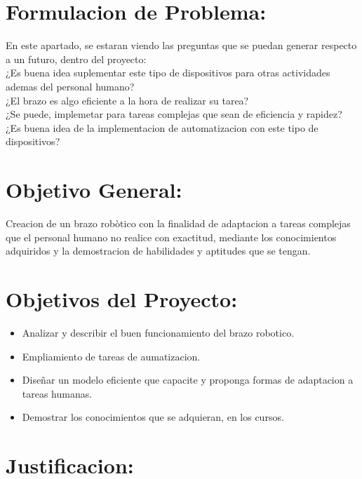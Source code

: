 \documentclass[14pt,a4paper]{article}
\begin{document}
\section{Formulacion de Problema:}

En este apartado, se estaran viendo las preguntas que se puedan generar respecto a un futuro, dentro del proyecto:\\

¿Es buena idea suplementar este tipo de dispositivos para otras actividades ademas del personal humano?\\
¿El brazo es algo eficiente a la hora de realizar su tarea?\\
¿Se puede, implemetar para tareas complejas que sean de eficiencia y rapidez?\\
¿Es buena idea de la implementacion de automatizacion con este tipo de dispositivos? 

\section{Objetivo General:}

Creacion de un brazo robòtico con la finalidad de adaptacion a tareas complejas que el personal humano no realice con exactitud, mediante los conocimientos adquiridos y la demostracion de habilidades y aptitudes que se tengan. 

\section{Objetivos del Proyecto:}

\begin{itemize}
\item Analizar y describir el buen funcionamiento del brazo robotico.
\item Empliamiento de tareas de aumatizacion.
\item Diseñar un modelo eficiente que capacite y proponga formas de adaptacion a tareas humanas.
\item Demostrar los conocimientos que se adquieran, en los cursos. 
\end{itemize}

\section{Justificacion:}
\end{document}
